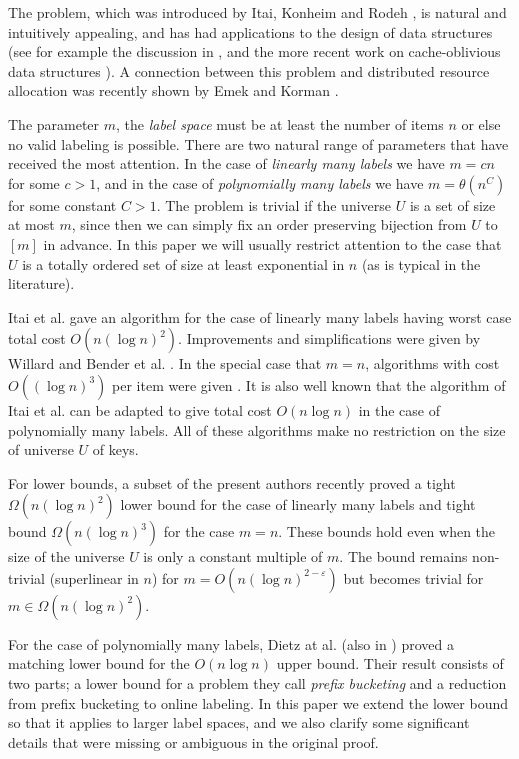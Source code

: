 \documentclass[11pt]{article}
\begin{document}
The problem, which was introduced by Itai, Konheim and Rodeh \cite{Itaietal},
is natural and intuitively appealing, and has had applications to the design of data structures (see for example
the discussion in \cite{DSZ04}, and the more recent work on cache-oblivious data structures
\cite{BenderetalB-Tree,Brodaletal,BDIW}).  A connection between this problem and distributed resource allocation
was recently shown by Emek and Korman \cite{EK11}.


The parameter $m$, the {\em label space} must be at least the number of items $n$ or else no valid labeling is possible.
There are two natural range of parameters that have received the most attention. In the case of {\em linearly many labels} we have
$m=cn$ for some $c>1$, and in the case of {\em polynomially many labels} we have $m=\theta(n^{C})$ for some constant $C>1$.
The problem is trivial if the universe $U$ is a set of size at most $m$, since then we can simply fix an order preserving
bijection from $U$ to $[m]$ in advance.  In this paper we will usually restrict attention to the case that  $U$
is a totally ordered set of size at least exponential in $n$ (as is typical in the literature).

Itai et al. \cite{Itaietal} gave an algorithm for the case of linearly many labels having worst case total cost
$O(n (\log n)^2)$.  Improvements and simplifications were given by Willard \cite{Willard} and Bender et al. \cite{Benderetal}.
In the special case that $m=n$, algorithms with cost $O((\log n)^3)$ per item were given
\cite{Zhang,BirdSadnicki}.  It is also
well known that the  algorithm of Itai et al. can be adapted to give total cost $O(n \log n)$ in the case
of polynomially many labels.
All of these algorithms make no restriction on the size of
universe $U$ of keys.

For lower bounds, a subset of the present authors
recently proved \cite{BKS} a tight $\Omega(n (\log n)^2)$ lower bound for the case of linearly many labels and tight bound $\Omega(n (\log n)^3)$ for
the case $m=n$. These bounds hold even when the size of the universe $U$ is only a constant multiple of $m$.  The bound remains
non-trivial (superlinear in $n$) for
$m  = O(n (\log n)^{2-\varepsilon})$ but
becomes trivial  for $m \in \Omega(n (\log n)^2)$.


For the case of polynomially many labels, Dietz at al. \cite{DSZ04} (also in \cite{Zhang}) proved a matching lower bound for the $O(n \log n)$ upper bound.
Their result consists of two parts; a lower bound for a problem they call {\em prefix bucketing}
and a reduction from prefix bucketing to online labeling.
In this paper we extend the lower bound so that it applies to larger label spaces,
and we also clarify some significant details that were missing or ambiguous in the original proof.
\end{document}
